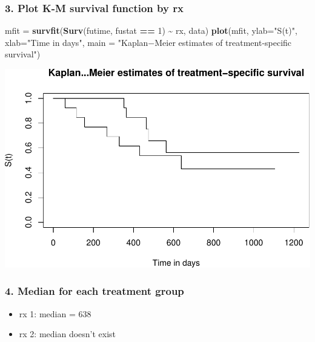 \documentclass[
]{article}
\newenvironment{Shaded}{\begin{snugshade}}{\end{snugshade}}
\newcommand{\AttributeTok}[1]{\textcolor[rgb]{0.13,0.29,0.53}{#1}}
\newcommand{\DecValTok}[1]{\textcolor[rgb]{0.00,0.00,0.81}{#1}}
\newcommand{\FunctionTok}[1]{\textcolor[rgb]{0.13,0.29,0.53}{\textbf{#1}}}
\newcommand{\NormalTok}[1]{#1}
\newcommand{\OtherTok}[1]{\textcolor[rgb]{0.56,0.35,0.01}{#1}}
\newcommand{\SpecialCharTok}[1]{\textcolor[rgb]{0.81,0.36,0.00}{\textbf{#1}}}
\newcommand{\StringTok}[1]{\textcolor[rgb]{0.31,0.60,0.02}{#1}}
\providecommand{\tightlist}{%
  \setlength{\itemsep}{0pt}\setlength{\parskip}{0pt}}
\begin{document}
\hypertarget{plot-k-m-survival-function-by-rx}{%
\subsubsection{3. Plot K-M survival function by
rx}\label{plot-k-m-survival-function-by-rx}}

\begin{Shaded}
\begin{Highlighting}[]
\NormalTok{mfit }\OtherTok{=} \FunctionTok{survfit}\NormalTok{(}\FunctionTok{Surv}\NormalTok{(futime, fustat }\SpecialCharTok{==} \DecValTok{1}\NormalTok{) }\SpecialCharTok{\textasciitilde{}}\NormalTok{ rx, data)}
\FunctionTok{plot}\NormalTok{(mfit, }\AttributeTok{ylab=}\StringTok{"S(t)"}\NormalTok{, }\AttributeTok{xlab=}\StringTok{"Time in days"}\NormalTok{,}
     \AttributeTok{main =} \StringTok{"Kaplan−Meier estimates of treatment{-}specific survival"}\NormalTok{)}
\end{Highlighting}
\end{Shaded}

\includegraphics{HW3_files/figure-latex/unnamed-chunk-4-1.pdf}

\hypertarget{median-for-each-treatment-group}{%
\subsubsection{4. Median for each treatment
group}\label{median-for-each-treatment-group}}

\begin{itemize}
\tightlist
\item
  rx 1: median = 638
\item
  rx 2: median doesn't exist
\end{itemize}
\end{document}
